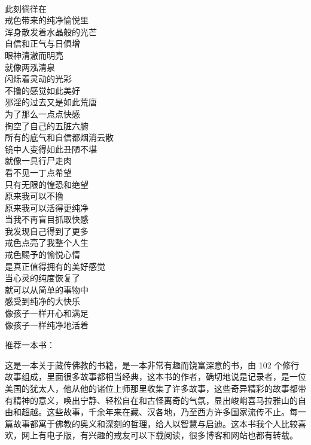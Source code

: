 \begin{poem}[童真住]
    \begin{multicols}{2}
        \begin{center}~\\
            此刻徜徉在 \\ 戒色带来的纯净愉悦里 \\ 浑身散发着水晶般的光芒 \\ 自信和正气与日俱增 \\ 眼神清澈而明亮 \\ 就像两泓清泉 \\ 闪烁着灵动的光彩 \\ 不撸的感觉如此美好 \\ 邪淫的过去又是如此荒唐 \\ 为了那么一点点快感 \\ 掏空了自己的五脏六腑 \\ 所有的底气和自信都烟消云散 \\ 镜中人变得如此丑陋不堪 \\ 就像一具行尸走肉 \\ 看不见一丁点希望 \\ 只有无限的惶恐和绝望 \\ 原来我可以不撸 \\ 原来我可以活得更纯净 \\ 当我不再盲目抓取快感 \\ 我发现自己得到了更多 \\ 戒色点亮了我整个人生 \\ 戒色赐予的愉悦心情 \\ 是真正值得拥有的美好感觉 \\ 当心灵的纯度恢复了 \\ 就可以从简单的事物中 \\ 感受到纯净的大快乐 \\ 像孩子一样开心和满足 \\ 像孩子一样纯净地活着
        \end{center}
    \end{multicols}
\end{poem}

推荐一本书：

\begin{book}[《雪狮的蓝绿色鬃毛》]
    这是一本关于藏传佛教的书籍，是一本非常有趣而饶富深意的书，由 102 个修行故事组成，里面很多故事都相当经典，这本书的作者，确切地说是记录者，是一位美国的犹太人，他从他的诸位上师那里收集了许多故事，这些奇异精彩的故事都带有精神的意义，唤出宁静、轻松自在和古怪离奇的气氛，显出峻峭喜马拉雅山的自由和超越。这些故事，千余年来在藏、汉各地，乃至西方许多国家流传不止。每一篇故事都寓于佛教的奥义和深刻的哲理，给人以智慧与启迪。这本书我个人比较喜欢，网上有电子版，有兴趣的戒友可以下载阅读，很多博客和网站也都有转载。
\end{book}
